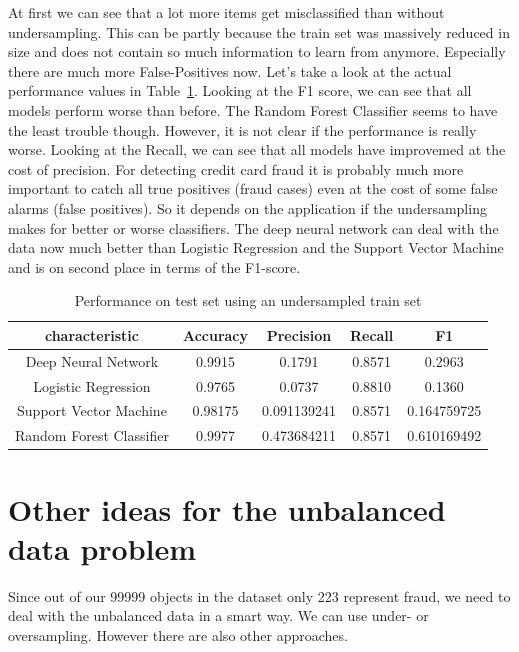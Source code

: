 \documentclass[utf8x]{ctexart}
\begin{document}
At first we can see that a lot more items get misclassified than without undersampling. This can be partly because the train set was massively reduced in size and does not contain so much information to learn from anymore. Especially there are much more False-Positives now. Let's take a look at the actual performance values in Table~\ref{tab:undersampling}. Looking at the F1 score, we can see that all models perform worse than before. The Random Forest Classifier seems to have the least trouble though. However, it is not clear if the performance is really worse. Looking at the Recall, we can see that
all models have improvemed at the cost of precision. For detecting credit card fraud it is probably much more important to catch all true positives (fraud cases) even at the cost of some false alarms (false positives). So it depends on the application if the undersampling makes for better or worse classifiers. The deep neural network can deal with the data now much better than Logistic Regression and the Support Vector Machine and is on second place in terms of the F1-score.

\begin{table}[ht]
  \centering
  \caption{Performance on test set using an undersampled train set}
  \label{tab:undersampling}
  \begin{tabular}{c|cccc}
    characteristic           & Accuracy & Precision   & Recall & F1          \\
    \hline
    Deep Neural Network      & 0.9915   & 0.1791      & 0.8571 & 0.2963      \\
    Logistic Regression      & 0.9765   & 0.0737      & 0.8810 & 0.1360      \\
    Support Vector Machine   & 0.98175  & 0.091139241 & 0.8571 & 0.164759725 \\
    Random Forest Classifier & 0.9977   & 0.473684211 & 0.8571 & 0.610169492 \\
  \end{tabular}
\end{table}


\section{Other ideas for the unbalanced data problem}

Since out of our 99999 objects in the dataset only 223 represent fraud, we need to deal with the unbalanced data in a smart way.
We can use under- or oversampling. However there are also other approaches.
\end{document}
